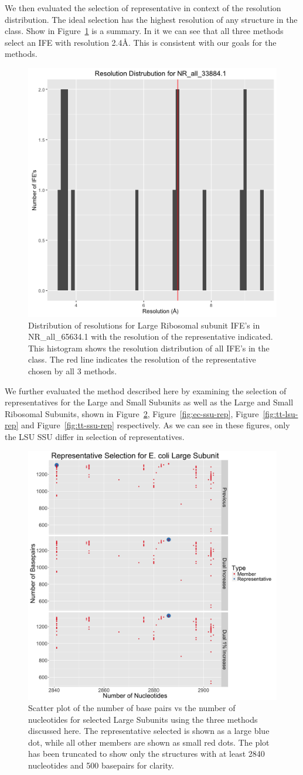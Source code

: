 We then evaluated the selection of representative in context of the resolution
distribution. The ideal selection has the highest resolution of any structure in
the class. Show in Figure~\ref{fig:hm-rep-res-dist} is a summary. In it we can
see that all three methods select an IFE with resolution 2.4{\AA}. This is
consistent with our goals for the methods.

\begin{figure}
  \includegraphics[width=0.5\linewidth]{chapter-4/figs/hm-lsu-res}
  \caption{Distribution of resolutions for \HM{} Large Ribosomal subunit IFE’s
    in NR\_all\_65634.1 with the resolution of the representative indicated.
    This histogram shows the resolution distribution of all IFE’s in the
    class. The red line indicates the resolution of the representative chosen by
  all 3 methods.}
  \label{fig:hm-rep-res-dist}
\end{figure}

We further evaluated the method described here by examining the selection of
representatives for the \EC{} Large and Small Subunits as well as the \TT{}
Large and Small Ribosomal Subunits, shown in Figure~\ref{fig:ec-lsu-rep},
Figure~\ref{fig:ec-ssu-rep}, Figure~\ref{fig:tt-lsu-rep} and
Figure~\ref{fig:tt-ssu-rep} respectively. As we can see in these figures, only
the \EC{} LSU \TT{} SSU differ in selection of representatives.

\begin{figure}
  \includegraphics[width=0.5\linewidth]{chapter-4/figs/ec-lsu-rep}
  \caption{Scatter plot of the number of base pairs vs the number of nucleotides
    for selected \EC{} Large Subunits using the three methods discussed here.
    The representative selected is shown as a large blue dot, while all other
    members are shown as small red dots. The plot has been truncated to show
    only the structures with at least 2840 nucleotides and 500 basepairs for
  clarity.}
  \label{fig:ec-lsu-rep}
\end{figure}

